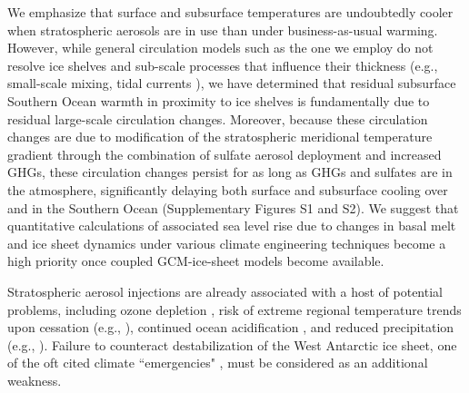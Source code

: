\documentclass{nature}
\begin{document}
We emphasize that surface and subsurface temperatures are undoubtedly cooler when stratospheric aerosols are in use than under business-as-usual warming. However, while general circulation models such as the one we employ do not resolve ice shelves and sub-scale processes that influence their thickness (e.g., small-scale mixing, tidal currents \cite{joughin11}), we have determined that residual subsurface Southern Ocean warmth in proximity to ice shelves is fundamentally due to residual large-scale circulation changes. Moreover, because these circulation changes are due to modification of the stratospheric meridional temperature gradient through the combination of sulfate aerosol deployment and increased GHGs, these circulation changes persist for as long as GHGs and sulfates are in the atmosphere, significantly delaying both surface and subsurface cooling over and in the Southern Ocean (Supplementary Figures S1 and S2). We suggest that quantitative calculations of associated sea level rise due to changes in basal melt and ice sheet dynamics under various climate engineering techniques become a high priority once coupled GCM-ice-sheet models become available.

Stratospheric aerosol injections are already associated with a host of potential problems, including ozone depletion \cite{tilmes08,heckendorn09}, risk of extreme regional temperature trends upon cessation (e.g., \cite{mccusker14}), continued ocean acidification \cite{feely04}, and reduced precipitation (e.g., \cite{bala08}). Failure to counteract destabilization of the West Antarctic ice sheet, one of the oft cited climate ``emergencies" \cite{blackstock09}, must be considered as an additional weakness.

\end{document}
